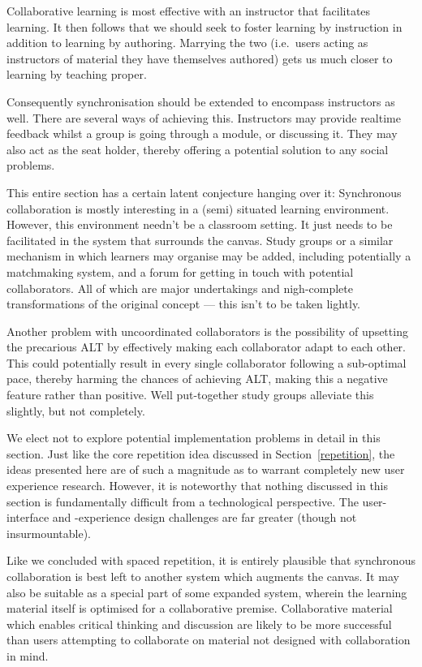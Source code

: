 \documentclass{article}
\begin{document}
\begin{multicols}{2}
Collaborative learning is most effective with an instructor that facilitates 
learning\cite{gokhale1995collaborative}. It then follows that we should seek 
to foster learning by instruction in addition to learning by authoring. 
Marrying the two (i.e.\ users acting as instructors of material they have 
themselves authored) gets us much closer to learning by teaching proper.

Consequently synchronisation should be extended to encompass instructors as 
well. There are several ways of achieving this. Instructors may provide 
realtime feedback whilst a group is going through a module, or discussing it. 
They may also act as the seat holder, thereby offering a potential solution to 
any social problems.

This entire section has a certain latent conjecture hanging over it: 
Synchronous collaboration is mostly interesting in a (semi) situated learning 
environment. However, this environment needn't be a classroom setting. It just
needs to be facilitated in the system that surrounds the canvas. Study groups 
or a similar mechanism in which learners may organise may be added, including 
potentially a matchmaking system, and a forum for getting in touch with 
potential collaborators. All of which are major undertakings and nigh-complete 
transformations of the original concept --- this isn't to be taken lightly.

Another problem with uncoordinated collaborators is the possibility of 
upsetting the precarious ALT by effectively making each collaborator adapt to 
each other. This could potentially result in every single collaborator 
following a sub-optimal pace, thereby harming the chances of achieving ALT, 
making this a negative feature rather than positive. Well put-together study 
groups alleviate this slightly, but not completely.

We elect not to explore potential implementation problems in detail in this 
section. Just like the core repetition idea discussed in 
Section~\ref{repetition}, the ideas presented here are of such a magnitude as 
to warrant completely new user experience research. However, it is noteworthy 
that nothing discussed in this section is fundamentally difficult from a 
technological perspective. The user-interface and -experience design 
challenges are far greater (though not insurmountable).

Like we concluded with spaced repetition, it is entirely plausible that 
synchronous collaboration is best left to another system which augments the 
canvas. It may also be suitable as a special part of some expanded system, 
wherein the learning material itself is optimised for a collaborative premise. 
Collaborative material which enables critical thinking and discussion are 
likely to be more successful than users attempting to collaborate on material 
not designed with collaboration in mind.


\end{multicols}
\end{document}
